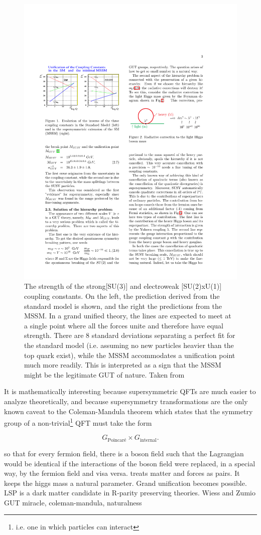    \begin{figure}[h!]
    \centering
    \includegraphics[width=.7\textwidth]{figures/SUSY_GUT_couplings.pdf}
    \caption{The strength of the strong[SU(3)] and electroweak [SU(2)xU(1)] coupling constants. On the left, the prediction derived from the standard model is shown, and the right the predictions from the MSSM. In a grand unified theory, the lines are expected to meet at a single point where all the forces unite and therefore have equal strength. There are 8 standard deviations separating a perfect fit for the standard model (i.e. assuming no new particles heavier than the top quark exist), while the MSSM accommodates a unification point much more readily. This is interpreted as a sign that the MSSM might be the legitimate GUT of nature. Taken from \cite{SUSY_RG}}
    \label{fig:susy_gut}
    \end{figure}

     It is mathematically interesting because supersymmetric QFTs are much easier to analyze theoretically, and because supersymmetry transformations are the only known caveat to the Coleman-Mandula theorem which states that the symmetry group of a non-trivial\footnote{i.e. one in which particles can interact} QFT must take the form 

    \[
      G_{\text{Poincaré}} \times G_{\text{internal}}.
    \]

     so that for every fermion field, there is a boson field such that the Lagrangian would be identical if the interactions of the boson field were replaced, in a special way, by the fermion field and visa versa. treats matter and forces as pairs. It keeps the higgs mass a natural parameter. Grand unification becomes possible. LSP is a dark matter candidate in R-parity preserving theories.
      Wiess and Zumio
      GUT miracle, coleman-mandula, naturalness

